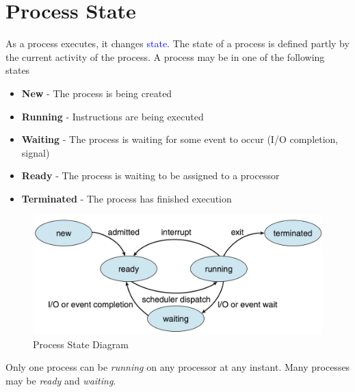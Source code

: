 \documentclass{book/custombook}
\begin{document}
        \section{Process State}
            As a process executes, it changes \textcolor{blue}{state}. The state of a process is defined partly by the current 
            activity of the process. A process may be in one of the following states
            \begin{itemize}
                \item \textbf{New} - The process is being created
                \item \textbf{Running} - Instructions are being executed
                \item \textbf{Waiting} - The process is waiting for some event to occur (I/O completion, signal)
                \item \textbf{Ready} - The process is waiting to be assigned to a processor
                \item \textbf{Terminated} - The process has finished execution
            \end{itemize}
            \begin{figure}[H]
                \centering
                \includegraphics[width=0.6\linewidth]{figures/process_state.png}
                \caption{Process State Diagram}
            \end{figure}
            Only one process can be \textit{running} on any processor at any instant. Many processes may be \textit{ready} and \textit{waiting}.
\end{document}

